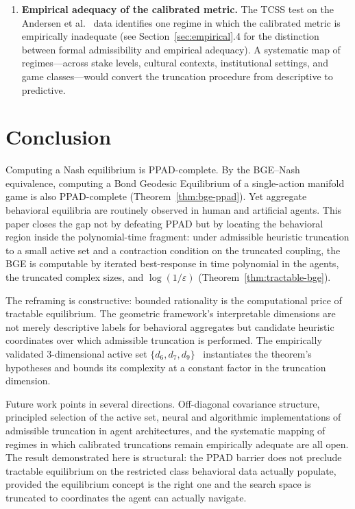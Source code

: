 \documentclass[11pt]{article}
\theoremstyle{definition}
\theoremstyle{remark}
\begin{document}
\begin{enumerate}
\item \textbf{Empirical adequacy of the calibrated metric.} The TCSS test on the
Andersen et al.~\cite{andersen2011} data identifies one regime in which the calibrated metric is
empirically inadequate (see Section~\ref{sec:empirical}.4 for the distinction between formal
admissibility and empirical adequacy). A systematic map of regimes---across stake levels, cultural
contexts, institutional settings, and game classes---would convert the truncation procedure from
descriptive to predictive.

\end{enumerate}


\section{Conclusion}
\label{sec:conclusion}

Computing a Nash equilibrium is \textsc{PPAD}-complete. By the BGE--Nash equivalence, computing a
Bond Geodesic Equilibrium of a single-action manifold game is also \textsc{PPAD}-complete
(Theorem~\ref{thm:bge-ppad}). Yet aggregate behavioral equilibria are routinely observed in human
and artificial agents. This paper closes the gap not by defeating \textsc{PPAD} but by locating the
behavioral region inside the polynomial-time fragment: under admissible heuristic truncation to a
small active set and a contraction condition on the truncated coupling, the BGE is computable by
iterated best-response in time polynomial in the agents, the truncated complex sizes, and
$\log(1/\varepsilon)$ (Theorem~\ref{thm:tractable-bge}).

The reframing is constructive: bounded rationality is the computational price of tractable
equilibrium. The geometric framework's interpretable dimensions are not merely descriptive labels for
behavioral aggregates but candidate heuristic coordinates over which admissible truncation is
performed. The empirically validated 3-dimensional active set
$\{d_6, d_7, d_9\}$~\cite{bond2026tcss} instantiates the theorem's hypotheses and bounds its
complexity at a constant factor in the truncation dimension.

Future work points in several directions. Off-diagonal covariance structure, principled selection of
the active set, neural and algorithmic implementations of admissible truncation in agent
architectures, and the systematic mapping of regimes in which calibrated truncations remain
empirically adequate are all open. The result demonstrated here is structural: the \textsc{PPAD}
barrier does not preclude tractable equilibrium on the restricted class behavioral data actually
populate, provided the equilibrium concept is the right one and the search space is truncated to
coordinates the agent can actually navigate.
\end{document}
